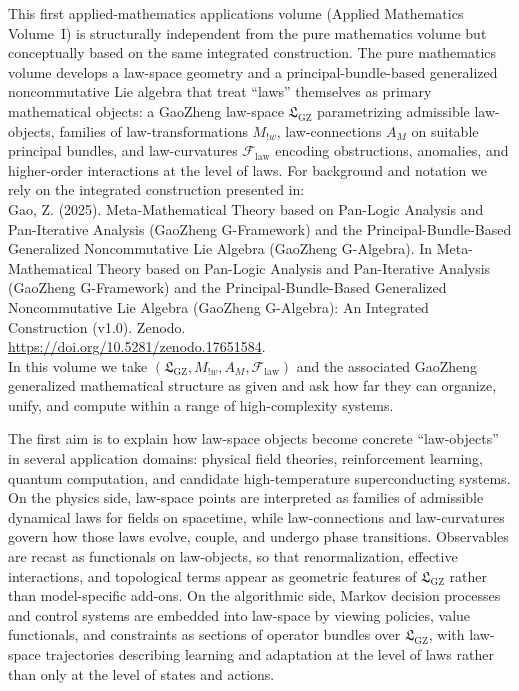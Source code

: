 \documentclass[11pt]{book}
\newcommand{\GZLS}{\ensuremath{\mathfrak{L}_{\mathrm{GZ}}}}
\newcommand{\GZLT}{\ensuremath{M_{!w}}}
\newcommand{\GZLOC}{\ensuremath{A_M}}
\newcommand{\GZLCurv}{\ensuremath{\mathcal{F}_{\mathrm{law}}}}
\theoremstyle{plain}
\theoremstyle{definition}
\theoremstyle{remark}
\begin{document}
This first applied-mathematics applications volume (Applied Mathematics Volume~I)
is structurally independent from the pure mathematics volume but conceptually
based on the same integrated construction. The pure mathematics volume develops a law-space
geometry and a principal-bundle-based generalized noncommutative
Lie algebra that treat ``laws'' themselves as primary mathematical
objects: a GaoZheng law-space $\GZLS$ parametrizing admissible
law-objects, families of law-transformations $\GZLT$, law-connections
$\GZLOC$ on suitable principal bundles, and law-curvatures $\GZLCurv$
encoding obstructions, anomalies, and higher-order interactions at
the level of laws. For background and notation we rely on the
integrated construction presented in:\\
Gao, Z. (2025). Meta-Mathematical Theory based on Pan-Logic Analysis and Pan-Iterative Analysis (GaoZheng G-Framework) and the Principal-Bundle-Based Generalized Noncommutative Lie Algebra (GaoZheng G-Algebra). In Meta-Mathematical Theory based on Pan-Logic Analysis and Pan-Iterative Analysis (GaoZheng G-Framework) and the Principal-Bundle-Based Generalized Noncommutative Lie Algebra (GaoZheng G-Algebra): An Integrated Construction (v1.0). Zenodo.\\
\url{https://doi.org/10.5281/zenodo.17651584}.\\
In this volume we take $(\GZLS,\GZLT,\GZLOC,\GZLCurv)$ and the
associated GaoZheng generalized mathematical structure as given and
ask how far they can organize, unify, and compute within a range of
high-complexity systems.

The first aim is to explain how law-space objects become concrete
``law-objects'' in several application domains: physical field
theories, reinforcement learning, quantum computation, and
candidate high-temperature superconducting systems. On the physics
side, law-space points are interpreted as families of admissible
dynamical laws for fields on spacetime, while law-connections and
law-curvatures govern how those laws evolve, couple, and undergo
phase transitions. Observables are recast as functionals on
law-objects, so that renormalization, effective interactions, and
topological terms appear as geometric features of $\GZLS$ rather
than model-specific add-ons. On the algorithmic side, Markov
decision processes and control systems are embedded into law-space
by viewing policies, value functionals, and constraints as sections
of operator bundles over $\GZLS$, with law-space trajectories
describing learning and adaptation at the level of laws rather than
only at the level of states and actions.
\end{document}
